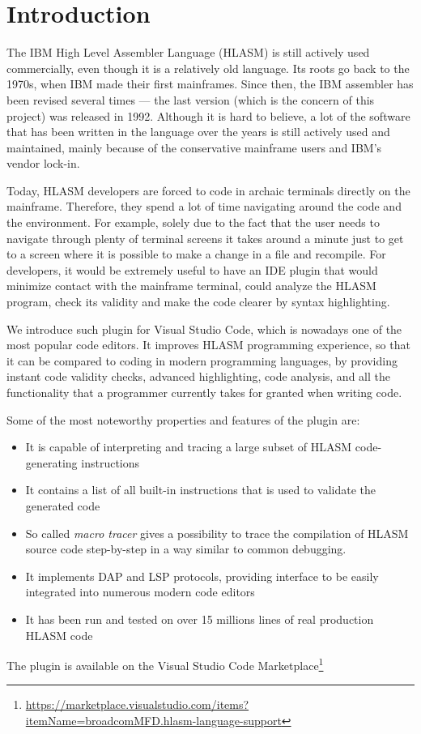 \chapter{Introduction}

The IBM High Level Assembler Language (HLASM) is still actively used commercially, even though it is a relatively old language. Its roots go back to the 1970s, when IBM made their first mainframes. Since then, the IBM assembler has been revised several times --- the last version (which is the concern of this project) was released in 1992. Although it is hard to believe, a lot of the software that has been written in the language over the years is still actively used and maintained, mainly because of the conservative mainframe users and IBM's vendor lock-in.

Today, HLASM developers are forced to code in archaic terminals directly on the mainframe. Therefore, they spend a lot of time navigating around the code and the environment. For example, solely due to the fact that the user needs to navigate through plenty of terminal screens it takes around a minute just to get to a screen where it is possible to make a change in a file and recompile. For developers, it would be extremely useful to have an IDE plugin that would minimize contact with the mainframe terminal, could analyze the HLASM program, check its validity and make the code clearer by syntax highlighting. 

We introduce such plugin for Visual Studio Code, which is nowadays one of the most popular code editors. It improves HLASM programming experience, so that it can be compared to coding in modern programming languages, by providing instant code validity checks, advanced highlighting, code analysis, and all the functionality that a programmer currently takes for granted when writing code.

Some of the most noteworthy properties and features of the plugin are:
\begin{itemize}
	\item It is capable of interpreting and tracing a large subset of HLASM code-generating instructions
	\item It contains a list of all built-in instructions that is used to validate the generated code
	\item So called \emph{macro tracer} gives a possibility to trace the compilation of HLASM source code step-by-step in a way similar to common debugging.
	\item It implements DAP and LSP protocols, providing interface to be easily integrated into numerous modern code editors
	\item It has been run and tested on over 15 millions lines of real production HLASM code
\end{itemize}
The plugin is available on the Visual Studio Code Marketplace\footnote{\url{https://marketplace.visualstudio.com/items?itemName=broadcomMFD.hlasm-language-support}}


